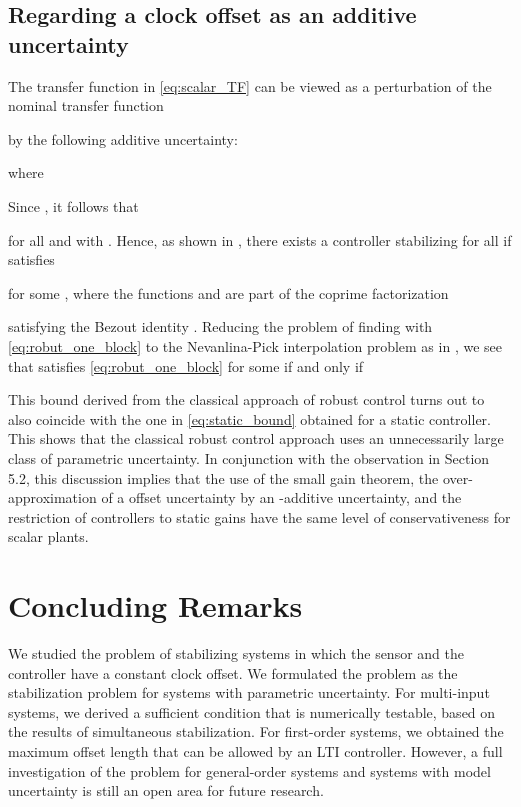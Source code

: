 \documentclass[letterpaper, 12pt, draftcls, onecolumn]{ieeeconf}
\begin{document}
\subsection{Regarding a clock offset as an 
	additive uncertainty}
The transfer function  
in \eqref{eq:scalar_TF} can be viewed
as a perturbation of the nominal transfer function

by the following additive uncertainty:

where

Since 
,
it follows that

for all  and 
with .
Hence, 
as shown in \cite[Sec. 3.5]{foias1996},
there exists a controller stabilizing 
for all  
if  satisfies

for some ,
where the  functions
 and  are part of the coprime factorization 
 
satisfying the Bezout identity .
Reducing the problem of finding  with
\eqref{eq:robut_one_block} to the Nevanlina-Pick interpolation problem
as in \cite[Sec. 4.3]{foias1996}, we see that 
 satisfies
\eqref{eq:robut_one_block} for some 
if and only if


This bound derived from the classical approach of  
robust control turns out to also coincide with the one
in \eqref{eq:static_bound} obtained for a static controller.
This shows that
the classical  robust control approach uses
an unnecessarily large class of parametric uncertainty. 
In conjunction with the observation in Section 5.2, 
this discussion implies that
the use of the small gain theorem, the over-approximation of a
offset uncertainty
by an -additive uncertainty, and
the restriction of controllers to static gains have
the same level of conservativeness for scalar plants.


\section{Concluding Remarks}
We studied the problem of stabilizing systems
in which the sensor and the controller have a constant
clock offset. 
We formulated the problem as the stabilization problem for systems with
parametric uncertainty.
For multi-input systems, we derived 
a sufficient condition that 
is numerically testable,
based on the results of simultaneous stabilization.
For first-order systems,
we obtained
the maximum offset length
that can be allowed by an LTI controller.
However, a full investigation of the problem 
for general-order systems 
and systems with model uncertainty  is still 
an open area for future research.
\end{document}
